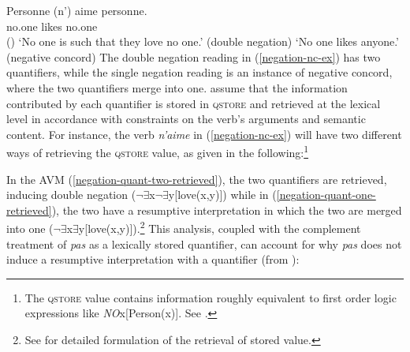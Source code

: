 \documentclass[output=paper
 	        ,biblatex
                ,babelshorthands
                ,newtxmath
                ,draftmode
                ,colorlinks, citecolor=brown
]{langscibook}
\begin{document}
\begin{exe}
\begin{xlist}
\ea \label{negation-nc-ex}
\gll Personne (n')                 aime personne.\\
     no.one   \hphantom{(}\NEG{} likes no.one\\\hfill()
\glt `No one is such that they love no one.' \hfill (double negation)
\glt `No one likes anyone.' \hfill  (negative concord)
\z
%
%
The double negation reading in (\ref{negation-nc-ex}) has two quantifiers, while the single
negation reading is an instance of negative concord, where the two
quantifiers merge into one.  assume that the information contributed by
each quantifier is stored in \textsc{qstore} and retrieved at the
lexical level in accordance with constraints on the verb's arguments and semantic
content. For instance, the verb \textit{n'aime} in (\ref{negation-nc-ex}) will have two different ways of retrieving the
\textsc{qstore} value, as given in the following:\footnote{The
\textsc{qstore} value contains information
roughly equivalent to first order logic expressions like \textit{NO}x[Person(x)]. See
\citet{Swart:02}.}

\eal
\ex
\label{negation-quant-two-retrieved}
\ex
\label{negation-quant-one-retrieved}
\zl
%
%
\noindent
In the AVM (\ref{negation-quant-two-retrieved}), the two quantifiers are retrieved, inducing double negation ($\neg\exists$x$\neg\exists$y[love(x,y)]) while in (\ref{negation-quant-one-retrieved}), the two have a resumptive interpretation in which the two are merged into one ($\neg\exists$x$\exists$y[love(x,y)]).\footnote{See \citet{Swart:02} for detailed formulation of the retrieval of stored value.} This analysis, coupled with the complement treatment of \textit{pas} as a lexically stored quantifier, can account
for why \emph{pas} does not induce a resumptive interpretation with a quantifier (from
\citealt[]{Swart:02}):



\end{xlist}
\end{exe}
\end{document}
